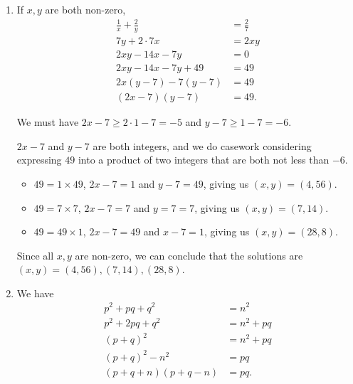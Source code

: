 \Question{\currfilebase}

\begin{enumerate}
    \item If \(x, y\) are both non-zero,
          \begin{align*}
              \frac{1}{x} + \frac{2}{y} & = \frac{2}{7} \\
              7y + 2 \cdot 7x           & = 2 xy        \\
              2xy - 14x - 7y            & = 0           \\
              2xy - 14x - 7y + 49       & = 49          \\
              2x (y - 7) - 7 (y - 7)    & = 49          \\
              (2x - 7) (y - 7)          & = 49.
          \end{align*}

          We must have \(2x - 7 \geq 2 \cdot 1 - 7 = -5\) and \(y - 7 \geq 1 - 7 = -6\).

          \(2x - 7\) and \(y - 7\) are both integers, and we do casework considering expressing \(49\) into a product of two integers that are both not less than \(-6\).
          \begin{itemize}
              \item \(49 = 1 \times 49\), \(2x - 7 = 1\) and \(y - 7 = 49\), giving us \((x, y) = (4, 56)\).
              \item \(49 = 7 \times 7\), \(2x - 7 = 7\) and \(y = 7 = 7\), giving us \((x, y) = (7, 14)\).
              \item \(49 = 49 \times 1\), \(2x - 7 = 49\) and \(x - 7 = 1\), giving us \((x, y) = (28, 8)\).
          \end{itemize}

          Since all \(x, y\) are non-zero, we can conclude that the solutions are \((x, y) = (4, 56), (7, 14), (28, 8)\).

    \item We have
          \begin{align*}
              p^2 + pq + q^2          & = n^2      \\
              p^2 + 2pq + q^2         & = n^2 + pq \\
              (p + q)^2               & = n^2 + pq \\
              (p + q)^2 - n^2         & = pq       \\
              (p + q + n) (p + q - n) & = pq.
          \end{align*}


\end{enumerate}
